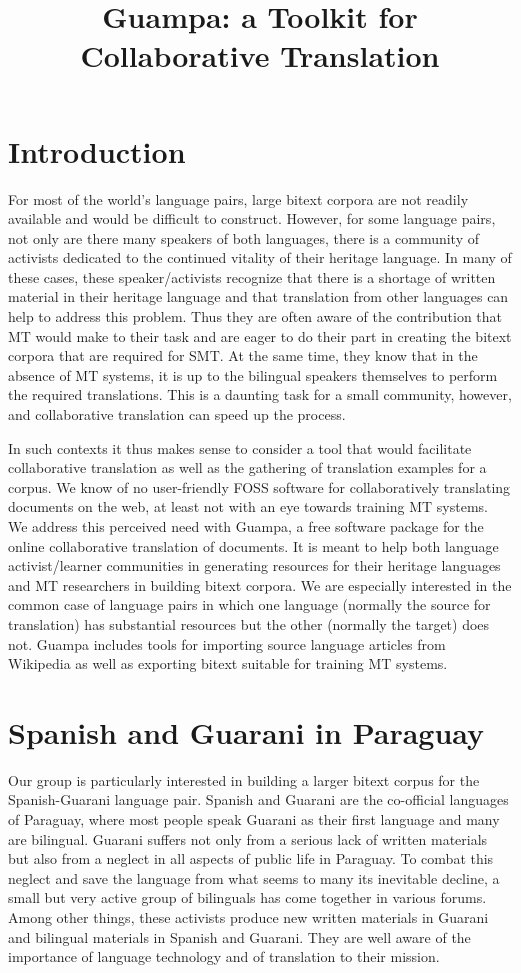 \documentclass[10pt, a4paper]{article}
\title{Guampa: a Toolkit for Collaborative Translation}
\begin{document}
\maketitleabstract

\section{Introduction}
For most of the world's language pairs, large bitext corpora are not readily
available and would be difficult to construct. However, for some language
pairs, not only are there many speakers of both languages, there is a community
of activists dedicated to the continued vitality of their heritage language. In
many of these cases, these speaker/activists recognize that there is a shortage
of written material in their heritage language and that translation from other
languages can help to address this problem. Thus they are often aware of the
contribution that MT would make to their task and are eager to do their part in
creating the bitext corpora that are required for SMT. At the same time, they
know that in the absence of MT systems, it is up to the bilingual speakers
themselves to perform the required translations. This is a daunting task for a
small community, however, and collaborative translation can speed up the
process.

In such contexts it thus makes sense to consider a tool that would facilitate
collaborative translation as well as the gathering of translation examples for
a corpus. We know of no user-friendly FOSS software for collaboratively
translating documents on the web, at least not with an eye towards training MT
systems. We address this perceived need with Guampa, a free software package
for the online collaborative translation of documents. It is meant to help both
language activist/learner communities in generating resources for their
heritage languages and MT researchers in building bitext corpora. We are
especially interested in the common case of language pairs in which one
language (normally the source for translation) has substantial resources but
the other (normally the target) does not. Guampa includes tools for importing
source language articles from Wikipedia as well as exporting bitext suitable
for training MT systems.

\section{Spanish and Guarani in Paraguay}
Our group is particularly interested in building a larger bitext corpus for the
Spanish-Guarani language pair. Spanish and Guarani are the co-official
languages of Paraguay, where most people speak Guarani as their first language
and many are bilingual. Guarani suffers not only from a serious lack of
written materials but also from a neglect in all aspects of public life in
Paraguay. To combat this neglect and save the language from what seems to many
its inevitable decline, a small but very active group of bilinguals has come
together in various forums. Among other things, these activists produce new
written materials in Guarani and bilingual materials in Spanish and Guarani.
They are well aware of the importance of language technology and of translation
to their mission.
\end{document}
